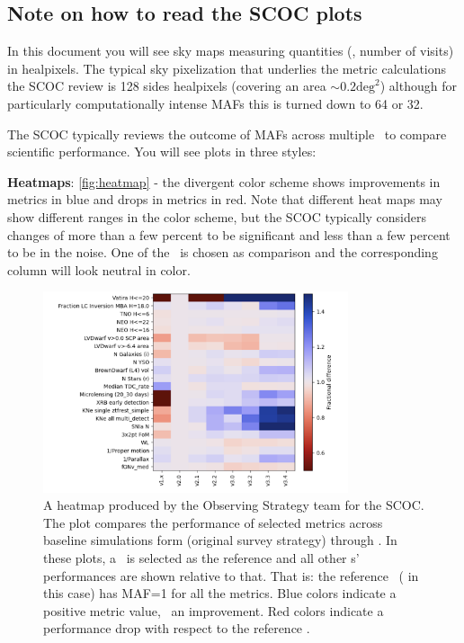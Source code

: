 \subsection{Note on how to read the SCOC plots}

In this document you will see sky maps measuring quantities (\eg, number of visits) in healpixels. The typical sky pixelization that underlies the metric calculations the SCOC review is 128 sides healpixels (covering an area $\sim 0.2\mathrm{deg}^2$) although for particularly computationally intense MAFs this is turned down to 64 or 32.

The SCOC typically reviews the outcome of MAFs across multiple \opsim\ to compare scientific performance. You will see plots in three styles:

{\bf Heatmaps}: \autoref{fig:heatmap} -
the divergent color scheme shows improvements in metrics in blue and drops in metrics in red. Note that different heat maps may show different ranges in the color scheme, but the SCOC typically considers changes of more than a few percent to be significant and less than a few percent to be in the noise. One of the \opsim\ is chosen as comparison and the corresponding column will look neutral in color.

\begin{figure}
    \centering

\includegraphics[width=0.8\textwidth]{figures/v1-v34heatmap.png}
\caption{A heatmap produced by the Observing Strategy team for the SCOC. The plot compares the performance of selected metrics across baseline simulations form  (original survey strategy) through . In these plots, a \opsim\ is selected as the reference and all other \opsim s' performances are shown relative to that. That is: the reference \opsim\ ( in this case) has MAF=1 for all the metrics. Blue colors indicate a positive metric value, \ie\ an improvement. Red colors indicate a performance drop with respect to the reference \opsim.}
\label{fig:heatmap}
\end{figure}


